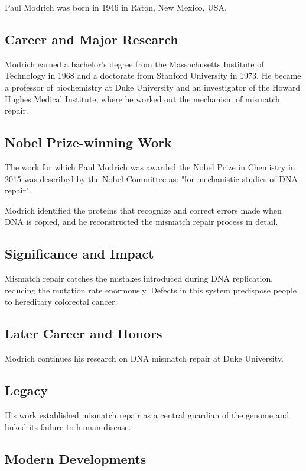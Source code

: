 Paul Modrich was born in 1946 in Raton, New Mexico, USA.

\subsection*{Career and Major Research}

Modrich earned a bachelor's degree from the Massachusetts Institute of Technology in 1968 and a doctorate from Stanford University in 1973. He became a professor of biochemistry at Duke University and an investigator of the Howard Hughes Medical Institute, where he worked out the mechanism of mismatch repair.

\subsection*{Nobel Prize-winning Work}

The work for which Paul Modrich was awarded the Nobel Prize in Chemistry in 2015 was described by the Nobel Committee as: "for mechanistic studies of DNA repair".

Modrich identified the proteins that recognize and correct errors made when DNA is copied, and he reconstructed the mismatch repair process in detail.

\subsection*{Significance and Impact}

Mismatch repair catches the mistakes introduced during DNA replication, reducing the mutation rate enormously. Defects in this system predispose people to hereditary colorectal cancer.

\subsection*{Later Career and Honors}

Modrich continues his research on DNA mismatch repair at Duke University.

\subsection*{Legacy}

His work established mismatch repair as a central guardian of the genome and linked its failure to human disease.

\subsection*{Modern Developments}

